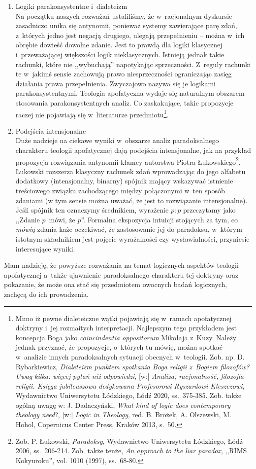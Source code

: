 \begin{enumerate}[label = \arabic*), itemindent=6mm, labelwidth=4mm, labelsep=2mm, itemsep=1em, leftmargin=0mm]
\item Logiki parakonsystentne i~dialeteizm\\
Na początku naszych rozważań ustaliliśmy, że w~racjonalnym dyskursie zasadniczo unika się antynomii, ponieważ systemy zawierające parę zdań, z~których jedno jest negacją drugiego, ulegają przepełnieniu -- można w~ich obrębie dowieść dowolne zdanie. Jest to prawdą dla logiki klasycznej i~przeważającej większości logik nieklasycznych. Istnieją jednak takie rachunki, które nie ,,wybuchają'' napotykając sprzeczności. Z~reguły rachunki te w~jakimś sensie zachowują prawo niesprzeczności ograniczając zasięg działania prawa przepełnienia. Zwyczajowo nazywa się je logikami parakonsystentnymi. Teologia apofatyczna wydaje się naturalnym obszarem stosowania parakonsystentnych analiz. Co zaskakujące, takie propozycje raczej nie pojawiają się w~literaturze przedmiotu\footnote{Mimo iż pewne dialeteiczne wątki pojawiają się w~ramach apofatycznej doktryny i~jej rozmaitych interpretacji. Najlepszym tego przykładem jest koncepcja Boga jako \textit{coincindentia oppositorum} Mikołaja z~Kuzy. Należy jednak przyznać, że propozycje, o~których tu mówię, można spotkać w~analizie innych paradoksalnych sytuacji obecnych w~teologii. Zob. np. D. Rybarkiewicz, \textit{Dialeteizm punktem spotkania Boga religii z~Bogiem filozofów? Uwag kilka: więcej pytań niż odpowiedzi}, [w:] \textit{Analiza, racjonalność, filozofia religii. Księga jubileuszowa dedykowana Profesorowi Ryszardowi Kleszczowi}, Wydawnictwo Uniwersytetu Łódzkiego, Łódź 2020, ss.~375-385. Zob. także ogólną uwagę w: J. Dadaczyński, \textit{What kind of logic does contemporary theology need}?, [w:] \textit{Logic in Theology}, red. B. Brożek, A. Olszewski, M. Hohol, Copernicus Center Press, Kraków 2013, s.~50.}.

\item Podejścia intensjonalne\\
Duże nadzieje na ciekawe wyniki w~obszarze analiz paradoksalnego charakteru teologii apofatycznej dają podejścia intensjonalne, jak na przykład propozycja rozwiązania antynomii kłamcy autorstwa Piotra Łukowskiego\footnote{Zob. P. Łukowski, \textit{Paradoksy}, Wydawnictwo Uniwersytetu Łódzkiego, Łódź 2006, ss.~206-214. Zob. także tenże, \textit{An approach to the liar paradox}, ,,RIMS Kokyuroku'', vol. 1010 (1997), ss.~68-80.}. Łukowski rozszerza klasyczny rachunek zdań wprowadzając do jego alfabetu dodatkowy (intensjonalny, binarny) spójnik mający wskazywać istnienie treściowego związku zachodzącego między połączonymi w~ten sposób zdaniami (w tym sensie można uważać, że jest to rozwiązanie intensjonalne). Jeśli spójnik ten oznaczymy średnikiem, wyrażenie $p:p$ przeczytamy jako ,,Zdanie $p$~mówi, że $p$''. Formalna ekspozycja intuicji stojących za tym, co \textit{mówią} zdania każe oczekiwać, że zastosowanie jej do paradoksu, w~którym istotnym składnikiem jest pojęcie wyrażalności czy wysławialności, przyniesie interesujące wyniki.
\end{enumerate}

Mam nadzieję, że powyższe rozważania na temat logicznych aspektów teologii apofatycznej a~także ujawnienie paradoksalnego charakteru tej doktryny oraz pokazanie, że może ona stać się przedmiotem owocnych badań logicznych, zachęcą do ich prowadzenia.


